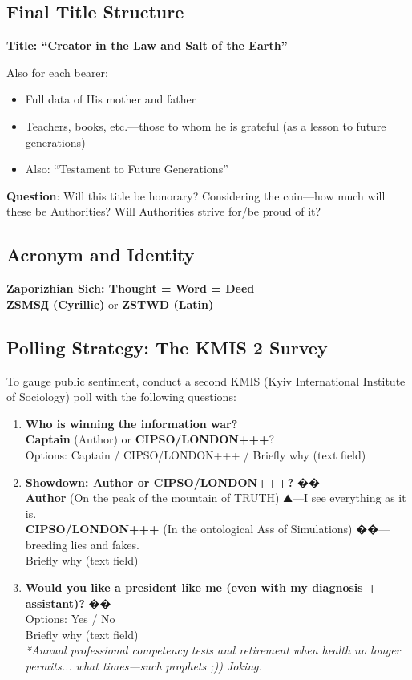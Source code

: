 \documentclass[11pt,a4paper]{article}
\theoremstyle{definition}
\theoremstyle{remark}
\begin{document}
\subsection{Final Title Structure}

\textbf{Title: ``Creator in the Law and Salt of the Earth''}

Also for each bearer:
\begin{itemize}
\item Full data of His mother and father
\item Teachers, books, etc.—those to whom he is grateful (as a lesson to future generations)
\item Also: ``Testament to Future Generations''
\end{itemize}

\textbf{Question}: Will this title be honorary? Considering the coin—how much will these be Authorities? Will Authorities strive for/be proud of it?

\subsection{Acronym and Identity}

\textbf{Zaporizhian Sich: Thought = Word = Deed} \\
\textbf{ZSMSД (Cyrillic)} or \textbf{ZSTWD (Latin)}

\subsection{Polling Strategy: The KMIS 2 Survey}

To gauge public sentiment, conduct a second KMIS (Kyiv International Institute of Sociology) poll with the following questions:

\begin{enumerate}
\item \textbf{Who is winning the information war?} \\
\textbf{Captain} (Author) or \textbf{CIPSO/LONDON+++}? \\
Options: Captain / CIPSO/LONDON+++ / Briefly why (text field)

\item \textbf{Showdown: Author or CIPSO/LONDON+++?} �� \\
\textbf{Author} (On the peak of the mountain of TRUTH) ⛰️—I see everything as it is. \\
\textbf{CIPSO/LONDON+++} (In the ontological Ass of Simulations) ��—breeding lies and fakes. \\
Briefly why (text field)

\item \textbf{Would you like a president like me (even with my diagnosis + assistant)?} �� \\
Options: Yes / No \\
Briefly why (text field) \\
\textit{*Annual professional competency tests and retirement when health no longer permits... what times—such prophets ;)) Joking.}
\end{enumerate}
\end{document}
